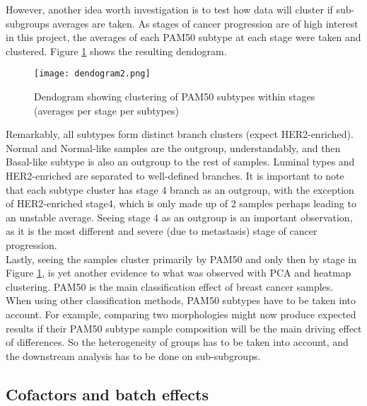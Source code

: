     \newpage
    However, another idea worth investigation is to test how data will cluster if sub-subgroups averages are taken. As stages of cancer progression are of high interest in this project, the averages of each PAM50 subtype at each stage were taken and clustered. Figure \ref{fig:dendogram} shows the resulting dendogram. 
    
            \begin{figure}[!h]
            \centering
            \texttt{[image: dendogram2.png]}
            \caption{Dendogram showing clustering of PAM50 subtypes within stages (averages per stage per subtypes)}
            \label{fig:dendogram}
            \end{figure}
    
    Remarkably, all subtypes form distinct branch clusters (expect HER2-enriched). Normal and Normal-like samples are the outgroup, understandably, and then Basal-like subtype is also an outgroup to the rest of samples. Luminal types and HER2-enriched are separated to well-defined branches. It is important to note that each subtype cluster has stage 4 branch as an outgroup, with the exception of HER2-enriched stage4, which is only made up of 2 samples perhaps leading to an unstable average. Seeing stage 4 as an outgroup is an important observation, as it is the most different and severe (due to metastasis) stage of cancer progression. \\
    
    Lastly, seeing the samples cluster primarily by PAM50 and only then by stage in Figure \ref{fig:dendogram}, is yet another evidence to what was observed with PCA and heatmap clustering. PAM50 is the main classification effect of breast cancer samples. When using other classification methods, PAM50 subtypes have to be taken into account. For example, comparing two morphologies might now produce expected results if their PAM50 subtype sample composition will be the main driving effect of differences. So the heterogeneity of groups has to be taken into account, and the downstream analysis has to be done on sub-subgroups.  
    
     

    
 
    
    \newpage
    \subsection{Cofactors and batch effects}
    
